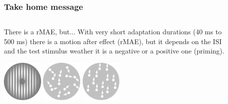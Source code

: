 \documentclass[xcolor={fixpdftex,hyperref,x11names},10pt,pdftex,hyperref={pdftex}]{beamer}
\begin{document}
\begin{frame}
    \frametitle{Take home message}
  \begin{columns}[t]
      \begin{column}{0.7\textwidth}
        \begin{block}{There is a rMAE, but$\dots$}
            With very short adaptation durations (40 ms to 500 ms) there is
            a motion after effect (rMAE), but it depends on the ISI and the
            test stimulus weather it is a negative or a positive one
            (priming).
        \end{block}

        \vspace{1cm}
        \begin{center}
       \includegraphics[width=2cm]{./bilder/test_stim_ambiguous.png}
       \includegraphics[width=2cm]{./bilder/test_stim_coherence.pdf}
       \includegraphics[width=2cm]{./bilder/test_stim_upwards.pdf}
        \end{center}
      \end{column}
      \begin{column}{0.3\textwidth}
        \begin{figure}[h]
          \centering

\end{figure}
\end{column}
\end{columns}
\end{frame}
\end{document}
